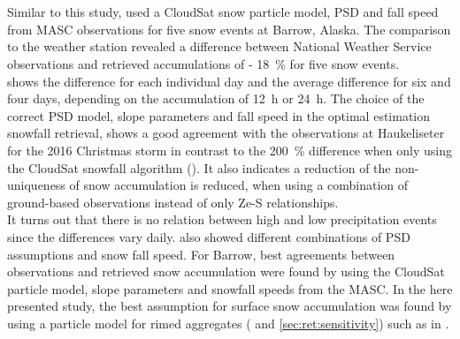 \\
\\
Similar to this study, \citet{cooper_variational_2017} used a CloudSat snow particle model, PSD and fall speed from MASC observations for five snow events at Barrow, Alaska. The comparison to the weather station revealed a difference between National Weather Service observations and retrieved accumulations of \SI{- 18}{\percent} for five snow events.
\\
 shows the difference for each individual day and the average difference for six and four days, depending on the accumulation of \SI{12}{\hour} or \SI{24}{\hour}.
The choice of the correct PSD model, slope parameters and fall speed in the optimal estimation snowfall retrieval, shows a good agreement with the observations at Haukeliseter for the 2016 Christmas storm in contrast to the \SI{200}{\percent} difference when only using the CloudSat snowfall algorithm (). It also indicates a reduction of the non-uniqueness of snow accumulation is reduced, when using a combination of ground-based observations instead of only Ze-S relationships. 
\\
It turns out that there is no relation between high and low precipitation events since the differences vary daily. \citet{cooper_variational_2017} also showed different combinations of PSD assumptions and snow fall speed. For Barrow, best agreements between observations and retrieved snow accumulation were found by using the CloudSat particle model, slope parameters and snowfall speeds from the MASC. In the here presented study, the best assumption for surface snow accumulation was found by using a particle model for rimed aggregates ( and \ref{sec:ret:sensitivity}) such as in .
